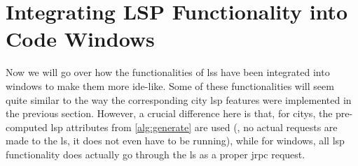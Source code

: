 \documentclass[../thesis]{subfiles}
\begin{document}
\section{Integrating LSP Functionality into Code Windows}\label{sec:intowindow}
Now we will go over how the functionalities of \glspl{ls} have been integrated into \glspl{window} to make them more \gls{ide}-like.
Some of these functionalities will seem quite similar to the way the corresponding \gls{city} \gls{lsp} features were implemented in the previous section.
However, a crucial difference here is that, for \glspl{city}, the pre-computed \gls{lsp} attributes from \cref{alg:generate} are used (\ie, no actual requests are made to the \gls{ls}, it does not even have to be running), while for \glspl{window}, all \gls{lsp} functionality does actually go through the \gls{ls} as a proper \gls{jrpc} request.
\end{document}
